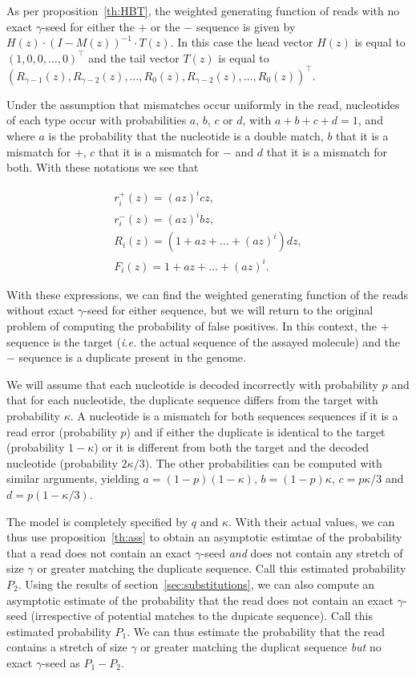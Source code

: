 \documentclass{article}
\begin{document}
As per proposition~\ref{th:HBT}, the weighted generating function of reads
with no exact $\gamma$-seed for either the $+$ or the $-$ sequence is
given by $H(z) \cdot (I-M(z))^{-1} \cdot T(z)$. In this case the head
vector $H(z)$ is equal to $(1,0,0,\ldots,0)^\top$ and the tail vector
$T(z)$ is equal to $(R_{\gamma-1}(z), R_{\gamma-2}(z), \ldots, R_0(z),
R_{\gamma-2}(z), \ldots, R_0(z))^\top$.

Under the assumption that mismatches occur uniformly in the read,
nucleotides of each type occur with probabilities $a$, $b$, $c$ or $d$,
with $a+b+c+d=1$, and where $a$ is the probability that the nucleotide is
a double match, $b$ that it is a mismatch for $+$, $c$ that it is a
mismatch for $-$ and $d$ that it is a mismatch for both. With these
notations we see that

\begin{gather*}
r_i^+(z) = (az)^icz, \\
r_i^-(z) = (az)^ibz, \\
R_i(z) = (1 + az + \ldots + (az)^i)dz, \\
F_i(z) = 1 + az + \ldots + (az)^i.
\end{gather*}

With these expressions, we can find the weighted generating function of
the reads without exact $\gamma$-seed for either sequence, but we will
return to the original problem of computing the probability of false
positives. In this context, the $+$ sequence is the target (\textit{i.e.}
the actual sequence of the assayed molecule) and the $-$ sequence is a
duplicate present in the genome.

We will assume that each nucleotide is decoded incorrectly with
probability $p$ and that for each nucleotide, the duplicate sequence
differs from the target with probability $\kappa$. A nucleotide is a
mismatch for both sequences sequences if it is a read error (probability
$p$) and if either the duplicate is identical to the target (probability
$1-\kappa$) or it is different from both the target and the decoded
nucleotide (probability $2\kappa/3$). The other probabilities can be
computed with similar arguments, yielding $a = (1-p)(1-\kappa)$, $b =
(1-p)\kappa$, $c = p\kappa/3$ and $d = p(1-\kappa/3)$.

The model is completely specified by $q$ and $\kappa$. With their actual
values, we can thus use proposition~\ref{th:ass} to obtain an asymptotic
estimtae of the probability that a read does not contain an exact
$\gamma$-seed \emph{and} does not contain any stretch of size $\gamma$ or
greater matching the duplicate sequence. Call this estimated probability
$P_2$. Using the results of section~\ref{sec:substitutions}, we can also
compute an asymptotic estimate of the probability that the read does not
contain an exact $\gamma$-seed (irrespective of potential matches to the
dupicate sequence). Call this estimated probability $P_1$. We can thus
estimate the probability that the read contains a stretch of size $\gamma$
or greater matching the duplicat sequence \emph{but} no exact
$\gamma$-seed as $P_1 - P_2$.
\end{document}
